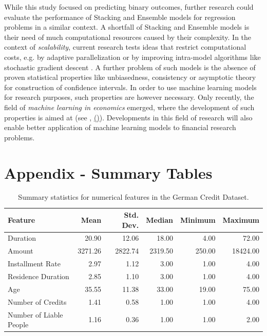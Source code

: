 \documentclass[12pt]{article}
\begin{document}
While this study focused on predicting binary outcomes, further research could evaluate the performance of Stacking and Ensemble models for regression problems in a similar context. A shortfall of Stacking and Ensemble models is their need of much computational resources caused by their complexity. In the context of \textit{scalability}, current research tests ideas that restrict computational costs, e.g. by adaptive parallelization \citep{li2014communication} or by improving intra-model algorithms like stochastic gradient descent \citep{bottou2012stochastic}. A further problem of such models is the absence of proven statistical properties like unbiasedness, consistency or asymptotic theory for construction of confidence intervals. In order to use machine learning models for research purposes, such properties are however necessary. Only recently, the field of \textit{machine learning in economics} emerged, where the development of such properties is aimed at (see \cite{athey2017impact}, \citeauthor{wager2018est} \hyperlink{wager2018est}{(\color{Black}{in press})}). Developments in this field of research will also enable better application of machine learning models to financial research problems.







\newpage
\appendix
\section{Appendix - Summary Tables}

\begin{table}[ht]
\centering
\begin{tabular}{lrrrrr}
  \hline
 Feature & Mean & Std. Dev. & Median & Minimum & Maximum \\ 
  \hline
Duration & 20.90 & 12.06 & 18.00 & 4.00 & 72.00 \\ 
  Amount & 3271.26 & 2822.74 & 2319.50 & 250.00 & 18424.00 \\ 
  Installment Rate & 2.97 & 1.12 & 3.00 & 1.00 & 4.00 \\ 
  Residence Duration & 2.85 & 1.10 & 3.00 & 1.00 & 4.00 \\ 
  Age & 35.55 & 11.38 & 33.00 & 19.00 & 75.00 \\ 
  Number of Credits & 1.41 & 0.58 & 1.00 & 1.00 & 4.00 \\ 
  Number of Liable People & 1.16 & 0.36 & 1.00 & 1.00 & 2.00 \\ 
   \hline
\end{tabular}
\caption[Summary statistics for numerical features]{Summary statistics for numerical features in the German Credit Dataset.}\label{summary_numeric}
\end{table}
\end{document}
